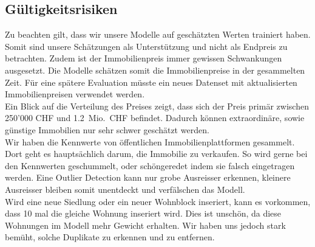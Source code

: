 \subsection{Gültigkeitsrisiken}
Zu beachten gilt, dass wir unsere Modelle auf geschätzten Werten trainiert haben. Somit sind unsere Schätzungen als Unterstützung und nicht als Endpreis zu betrachten. Zudem ist der Immobilienpreis immer gewissen Schwankungen ausgesetzt. Die Modelle schätzen somit die Immobilienpreise in der gesammelten Zeit. Für eine spätere Evaluation müsste ein neues Datenset mit aktualisierten Immobilienpreisen verwendet werden.\\
Ein Blick auf die Verteilung des Preises zeigt, dass sich der Preis primär zwischen 250'000 CHF und 1.2~Mio.~CHF befindet. Dadurch können extraordinäre, sowie günstige  Immobilien nur sehr schwer geschätzt werden.\\[2ex]
%
Wir haben die Kennwerte von öffentlichen Immobilienplattformen gesammelt. Dort geht es hauptsächlich darum, die Immobilie zu verkaufen. So wird gerne bei den Kennwerten geschummelt, oder schöngeredet indem sie falsch eingetragen werden. Eine Outlier Detection kann nur grobe Ausreisser erkennen, kleinere Ausreisser bleiben somit unentdeckt und verfälschen das Modell.\\
Wird eine neue Siedlung oder ein neuer Wohnblock inseriert, kann es vorkommen, dass 10 mal die gleiche Wohnung inseriert wird. Dies ist unschön, da diese Wohnungen im Modell mehr Gewicht erhalten. Wir haben uns jedoch stark bemüht, solche Duplikate zu erkennen und zu entfernen.

